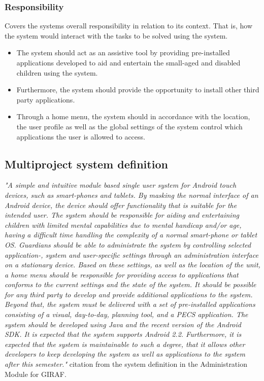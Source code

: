 \subsubsection{Responsibility} 
Covers the systems overall responsibility in relation to its context. That is, how the system would interact with the tasks to be solved using the system.
\begin{itemize}
	\item The system should act as an assistive tool by providing pre-installed applications developed to aid and entertain the small-aged and disabled children using the system. 
	\item Furthermore, the system should provide the opportunity to install other third party applications. 
	\item Through a home menu, the system should in accordance with the location, the user profile as well as the global settings of the system control which applications the user is allowed to access.
\end{itemize}

\subsection{Multiproject system definition}

\textit{"A simple and intuitive module based single user system for Android touch devices, such as smart-phones and tablets. By masking the normal interface of an Android device, the device should offer functionality that is suitable for the intended user.
The system should be responsible for aiding and entertaining children with limited mental capabilities due to mental handicap and/or age, having a difficult time handling the complexity of a normal smart-phone or tablet OS. Guardians should be able to administrate the system by controlling selected application-, system and user-specific settings through an administration interface on a stationary device. Based on these settings, as well as the location of the unit, a home menu should be responsible for providing access to applications that conforms to the current settings and the state of the system. It should be possible for any third party to develop and provide additional applications to the system. Beyond that, the system must be delivered with a set of pre-installed applications consisting of a visual, day-to-day, planning tool, and a PECS application. The system should be developed using Java and the recent version of the Android SDK. It is expected that the system supports Android 2.2. Furthermore, it is expected that the system is maintainable to such a degree, that it allows other developers to keep developing the system as well as applications to the system after this semester."} citation from the system definition in the Administration Module for GIRAF.\cite{giraffactors}

